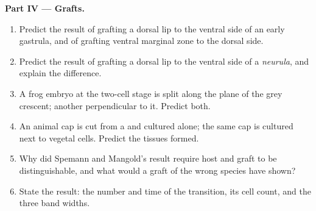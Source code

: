 \begin{problem}
\medskip
\noindent\textbf{Part IV --- Grafts.}
\begin{enumerate}[resume]
  \item Predict the result of grafting a dorsal lip to the ventral
        side of an early gastrula, and of grafting ventral marginal
        zone to the dorsal side.
  \item Predict the result of grafting a dorsal lip to the ventral
        side of a \emph{neurula}, and explain the difference.
  \item A frog embryo at the two-cell stage is split along the plane
        of the grey crescent; another perpendicular to it. Predict
        both.
  \item An animal cap is cut from a  and cultured alone; the
        same cap is cultured next to vegetal cells. Predict the
        tissues formed.
  \item Why did Spemann and Mangold's result require host and graft
        to be distinguishable, and what would a graft of the wrong
        species have shown?
  \item State the result: the  number and time of the
        transition, its cell count, and the three band widths.
\end{enumerate}
\end{problem}
